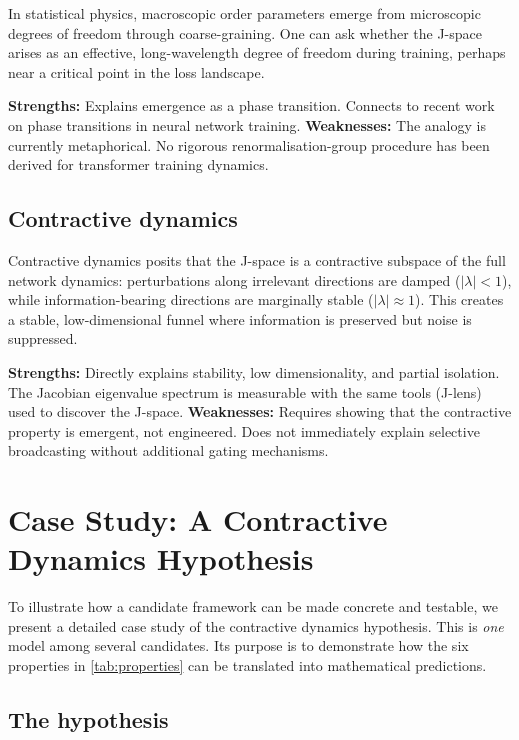 \documentclass[11pt,a4paper]{article}
\theoremstyle{definition}
\begin{document}
In statistical physics, macroscopic order parameters emerge from microscopic
degrees of freedom through coarse-graining. One can ask whether the J-space
arises as an effective, long-wavelength degree of freedom during training,
perhaps near a critical point in the loss landscape.

\textbf{Strengths:} Explains emergence as a phase transition. Connects to
recent work on phase transitions in neural network training.
\textbf{Weaknesses:} The analogy is currently metaphorical. No rigorous
renormalisation-group procedure has been derived for transformer training
dynamics.

\subsection{Contractive dynamics}

Contractive dynamics posits that the J-space is a contractive subspace of the
full network dynamics: perturbations along irrelevant directions are damped
($|\lambda| < 1$), while information-bearing directions are marginally stable
($|\lambda| \approx 1$). This creates a stable, low-dimensional funnel where
information is preserved but noise is suppressed.

\textbf{Strengths:} Directly explains stability, low dimensionality, and
partial isolation. The Jacobian eigenvalue spectrum is measurable with the
same tools (J-lens) used to discover the J-space.
\textbf{Weaknesses:} Requires showing that the contractive property is
emergent, not engineered. Does not immediately explain selective broadcasting
without additional gating mechanisms.

\section{Case Study: A Contractive Dynamics Hypothesis}
\label{sec:case}

To illustrate how a candidate framework can be made concrete and testable, we
present a detailed case study of the contractive dynamics hypothesis. This is
\emph{one} model among several candidates. Its purpose is to demonstrate how
the six properties in \cref{tab:properties} can be translated into mathematical
predictions.

\subsection{The hypothesis}
\end{document}
